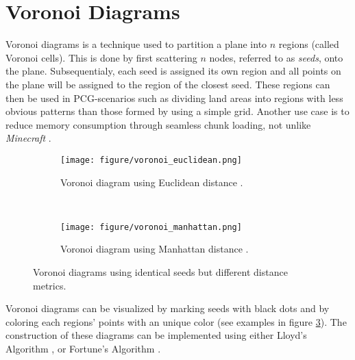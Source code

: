 \section{Voronoi Diagrams}

Voronoi diagrams is a technique used to partition a plane into $n$ regions (called Voronoi cells).
This is done by first scattering $n$ nodes, referred to as \textit{seeds}, onto the plane.
Subsequentialy, each seed is assigned its own region and all points on the plane will be assigned to the region of the closest seed.
These regions can then be used in PCG-scenarios such as dividing land areas into regions with less obvious patterns than those formed by using a simple grid.
Another use case is to reduce memory consumption through seamless chunk loading, not unlike \textit{Minecraft} \cite{minecraft}.

\begin{figure}[H]
  \centering
  \begin{subfigure}[b]{0.4\textwidth}
    \texttt{[image: figure/voronoi\_euclidean.png]}
    \caption{Voronoi diagram using Euclidean distance \cite{voronoi_euclidean}.}
    \label{fig:voronoi_euclidean}
  \end{subfigure}
  ~
  \begin{subfigure}[b]{0.4\textwidth}
    \texttt{[image: figure/voronoi\_manhattan.png]}
    \caption{Voronoi diagram using Manhattan distance \cite{voronoi_manhattan}.}
    \label{fig:voronoi_manhattan}
  \end{subfigure}
  \caption{Voronoi diagrams using identical seeds but different distance metrics.}
  \label{fig:voronoi}
\end{figure}
\vspace{-0.5cm} %

Voronoi diagrams can be visualized by marking seeds with black dots and by coloring each regions' points with an unique color (see examples in figure \ref{fig:voronoi}).
The construction of these diagrams can be implemented using either Lloyd's Algorithm \cite{voronoi_lloyd}, or Fortune's Algorithm \cite{voronoi_fortune}. 
